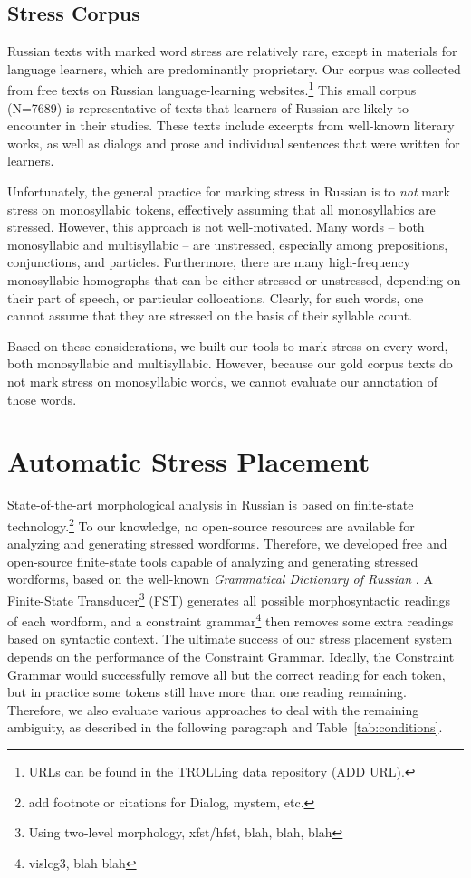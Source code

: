 \documentclass[11pt]{article}
\newcommand{\rus}[1]{\foreignlanguage{russian}{#1}}
\newcommand{\rr}[1]{\marginpar{\scriptsize R: #1}} %
\begin{document}
\subsection{Stress Corpus}

Russian texts with marked word stress are relatively rare, except in materials
for language learners, which are predominantly proprietary. Our corpus was 
collected from
free texts on Russian language-learning websites.\footnote{URLs can be found in
the TROLLing data repository (ADD URL).} This small corpus (N=7689) is 
representative of texts 
that learners of Russian are likely to encounter in their studies. These texts 
include excerpts from well-known literary works, as well as dialogs and 
prose and individual sentences that were written for learners.

Unfortunately, the general practice for marking stress in Russian is to
\emph{not} mark stress on monosyllabic tokens, effectively assuming that
all monosyllabics are stressed. However, this approach 
is not well-motivated. Many words -- both monosyllabic and multisyllabic -- are 
unstressed, especially among prepositions, conjunctions, and particles.
\rr{multisyllabics that can be unstressed: \rus{через, между}} Furthermore, there 
are many
high-frequency monosyllabic homographs that can be either stressed or unstressed, 
depending on their part of speech, or particular collocations. Clearly, for
such words, one cannot assume that they are stressed on the basis of their 
syllable count.

Based on these considerations, we built our tools to mark stress on every
word, both monosyllabic and multisyllabic. However, because our gold corpus texts 
do not mark stress on monosyllabic words, we cannot evaluate our annotation of 
those words.

\section{Automatic Stress Placement}

State-of-the-art morphological analysis in Russian is based on finite-state
technology.\footnote{add footnote or citations for Dialog, mystem, etc.} To our 
knowledge, no open-source resources are available for analyzing and generating 
stressed wordforms. Therefore, we developed free and open-source finite-state 
tools capable of analyzing and generating stressed wordforms, based on the
well-known \emph{Grammatical Dictionary of Russian} \cite{Zaliznjak-77}.
A Finite-State Transducer\footnote{Using two-level 
morphology, xfst/hfst, blah, blah, blah} (FST) generates all possible 
morphosyntactic readings of each wordform, and a constraint grammar\footnote{vislcg3, blah blah} then removes
some extra readings based on syntactic context. The ultimate success of our 
stress placement system depends on the performance of the Constraint Grammar. 
Ideally, the Constraint Grammar would successfully remove all but the correct 
reading for each token, but in practice some
tokens still have more than one reading remaining. Therefore,
we also evaluate various approaches to deal with the remaining ambiguity,
as described in the following paragraph and Table~\ref{tab:conditions}.
\end{document}
